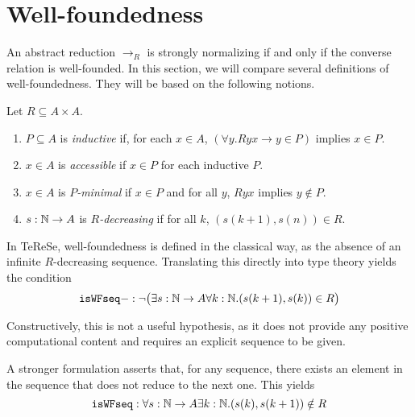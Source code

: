 \section{Well-foundedness}

\newcommand{\isWFacc}{\mathtt{isWFacc}}
\newcommand{\isWFseq}{\mathtt{isWFseq}}
\newcommand{\isWFmin}{\mathtt{isWFmin}}
\newcommand{\isWFaccm}{\mathtt{isWFacc-}}
\newcommand{\isWFseqm}{\mathtt{isWFseq-}}
\newcommand{\isWFminm}{\mathtt{isWFmin-}}
\newcommand{\then}{\Longrightarrow}
\label{sec:Well-foundedness}

An abstract reduction $\to_R$ is strongly normalizing
if and only if the converse relation is well-founded.
In this section, we will compare several definitions of well-foundedness.
They will be based on the following notions.

\begin{definition}
  Let $R \subseteq A \times A$.
  \begin{enumerate}
    \item $P \subseteq A$ is \emph{inductive}
    if, for each $x \in A$, $(\forall y. Ryx \to y \in P)$ implies $x \in P$.

    \item $x \in A$ is \emph{accessible} if $x \in P$ for each inductive $P$.

    \item $x \in A$ is \emph{$P$-minimal} if $x \in P$ and for all $y$,
    $Ryx$ implies $y \notin P$.

    \item $s : \mathbb{N} \to A$ is \emph{$R$-decreasing} if for all $k$, $(s(k+1),s(n)) \in R$.
  \end{enumerate}
\end{definition}

In TeReSe, well-foundedness is defined in the classical way,
as the absence of an infinite $R$-decreasing sequence.
Translating this directly into type theory yields the condition
\[\isWFseqm : \lnot \big(\exists s : \nat \to A \forall k : \nat. (s(k+1),s(k)) \in R \big) \]

Constructively, this is not a useful hypothesis, as it does not provide any positive computational content and requires an explicit sequence to be given.

A stronger formulation asserts that, for any sequence, there exists an element
in the sequence that does not reduce to the next one.  This yields
\[\isWFseq : \forall s : \nat \to A \exists k : \nat. (s(k),s(k+1)) \notin R \]

